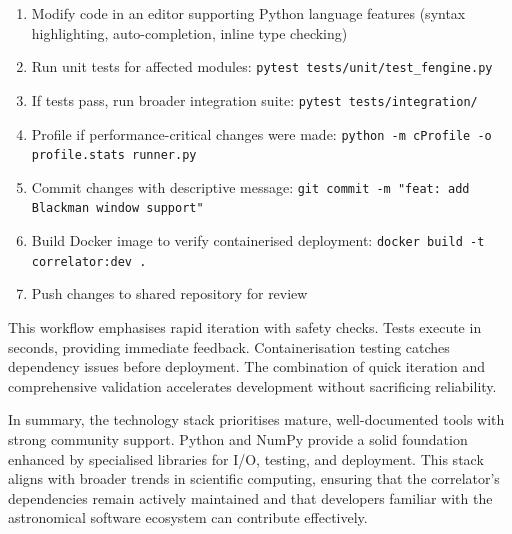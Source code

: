 \begin{enumerate}
    \item Modify code in an editor supporting Python language features (syntax highlighting, auto-completion, inline type checking)
    \item Run unit tests for affected modules: \texttt{pytest tests/unit/test\_fengine.py}
    \item If tests pass, run broader integration suite: \texttt{pytest tests/integration/}
    \item Profile if performance-critical changes were made: \texttt{python -m cProfile -o profile.stats runner.py}
    \item Commit changes with descriptive message: \texttt{git commit -m "feat: add Blackman window support"}
    \item Build Docker image to verify containerised deployment: \texttt{docker build -t correlator:dev .}
    \item Push changes to shared repository for review
\end{enumerate}

This workflow emphasises rapid iteration with safety checks. Tests execute in seconds, providing immediate feedback. Containerisation testing catches dependency issues before deployment. The combination of quick iteration and comprehensive validation accelerates development without sacrificing reliability.

In summary, the technology stack prioritises mature, well-documented tools with strong community support. Python and NumPy provide a solid foundation enhanced by specialised libraries for I/O, testing, and deployment. This stack aligns with broader trends in scientific computing, ensuring that the correlator's dependencies remain actively maintained and that developers familiar with the astronomical software ecosystem can contribute effectively.